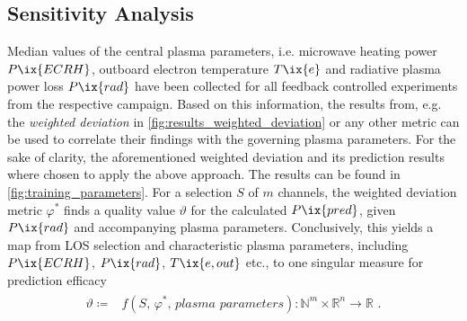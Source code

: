         \subsection{Sensitivity Analysis}\label{sec:senseresults}%
%
            Median values of the central plasma parameters, i.e. microwave heating power $P\ix{ECRH}$, outboard electron temperature $T\ix{e}$ and radiative plasma power loss $P\ix{rad}$ have been collected for all feedback controlled experiments from the respective campaign. Based on this information, the results from, e.g. the \textit{weighted deviation} in \cref{fig:results_weighted_deviation} or any other metric can be used to correlate their findings with the governing plasma parameters. For the sake of clarity, the aforementioned weighted deviation and its prediction results where chosen to apply the above approach. The results can be found in \cref{fig:training_parameters}. For a selection $S$ of $m$ channels, the weighted deviation metric $\varphi^{\ast}$ finds a quality value $\vartheta$ for the calculated $P\ix{pred}$, given $P\ix{rad}$ and accompanying plasma parameters. Conclusively, this yields a map from LOS selection and characteristic plasma parameters, including $P\ix{ECRH}$, $P\ix{rad}$, $T\ix{e,out}$ etc., to one singular measure for prediction efficacy%
%
            \begin{align}%
                \begin{split}\label{eq:sensitivity_parameter_map}%
                    \vartheta\coloneqq &f\left(S,\,\varphi^{\ast},\,\textit{plasma parameters}\right)\colon\mathbb{N}^{m}\times\mathbb{R}^{n}\to\mathbb{R}\,\,.%
                \end{split}%
            \end{align}%
%
